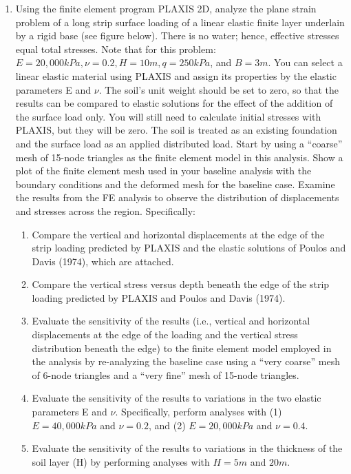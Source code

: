 \documentclass[a4paper,12pt]{article}
\begin{document}
\begin{enumerate}
	\item Using the finite element program PLAXIS 2D, analyze the plane strain problem of a long strip surface loading of a linear elastic finite layer underlain by a rigid base (see figure below).  There is no water; hence, effective stresses equal total stresses.  Note that for this problem: $E = 20,000 kPa, \nu = 0.2, H = 10 m, q = 250 kPa$, and $B = 3 m$.  You can select a linear elastic material using PLAXIS and assign its properties by the elastic parameters E and $\nu$.  The soil's unit weight should be set to zero, so that the results can be compared to elastic solutions for the effect of the addition of the surface load only.  You will still need to calculate initial stresses with PLAXIS, but they will be zero.  The soil is treated as an existing foundation and the surface load as an applied distributed load.  Start by using a ``coarse'' mesh of 15-node triangles as the finite element model in this analysis.  Show a plot of the finite element mesh used in your baseline analysis with the boundary conditions and the deformed mesh for the baseline case.  Examine the results from the FE analysis to observe the distribution of displacements and stresses across the region. Specifically:
	
	\begin{enumerate}
		\item Compare the vertical and horizontal displacements at the edge of the strip loading predicted by PLAXIS and the elastic solutions of Poulos and Davis (1974), which are attached.  
		
		\item Compare the vertical stress versus depth beneath the edge of the strip loading predicted by PLAXIS and Poulos and Davis (1974).
		
		\item Evaluate the sensitivity of the results (i.e., vertical and horizontal displacements at the edge of the loading and the vertical stress distribution beneath the edge) to the finite element model employed in the analysis by re-analyzing the baseline case using a ``very coarse'' mesh of 6-node triangles and a ``very fine'' mesh of 15-node triangles.
		
		\item Evaluate the sensitivity of the results to variations in the two elastic parameters E and $\nu$. Specifically, perform analyses with (1) $E = 40,000 kPa$ and $\nu= 0.2$, and (2) $E = 20,000 kPa$ and $\nu = 0.4$.
		
		\item Evaluate the sensitivity of the results to variations in the thickness of the soil layer (H) by performing analyses with $H = 5 m$ and $20 m$.
	\end{enumerate}


\end{enumerate}
\end{document}
